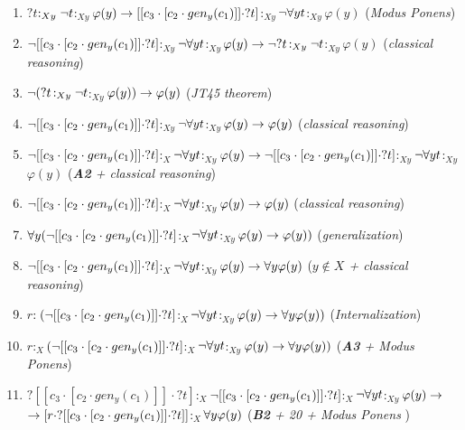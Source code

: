 \begin{enumerate}[1.]
\item $?t$$:_{Xy}\neg t$$:_{Xy}$$\varphi(y) \rightarrow [[c_{3} \cdot [c_{2} \cdot gen_{y}(c_{1})]]\cdot ?t]$$:_{Xy}$$\neg \forall y t$$:_{Xy}$$\varphi(y)$ (\textit{Modus Ponens})


\item $\neg[[c_{3} \cdot [c_{2} \cdot gen_{y}(c_{1})]]\cdot ?t]$$:_{Xy}$$\neg \forall y t$$:_{Xy}$$\varphi(y) \rightarrow \neg  ?t$$:_{Xy}\neg t$$:_{Xy}$$\varphi(y)$ (\textit{classical reasoning})

\item $\neg (?t$$:_{Xy}\neg t$$:_{Xy}$$\varphi(y)) \rightarrow \varphi(y)$ (\textit{JT45 theorem})


\item $\neg[[c_{3} \cdot [c_{2} \cdot gen_{y}(c_{1})]]\cdot ?t]$$:_{Xy}$$\neg \forall y t$$:_{Xy}$$\varphi(y)\rightarrow \varphi(y)$ (\textit{classical reasoning})

\item $\neg[[c_{3} \cdot [c_{2} \cdot gen_{y}(c_{1})]]\cdot ?t]$$:_{X}$$\neg \forall y t$$:_{Xy}$$\varphi(y)\rightarrow  \neg[[c_{3} \cdot [c_{2} \cdot gen_{y}(c_{1})]]\cdot ?t]$$:_{Xy}$$\neg \forall y t$$:_{Xy}$$\varphi(y)$ (\textit{\textbf{A2} + classical reasoning})

\item $\neg[[c_{3} \cdot [c_{2} \cdot gen_{y}(c_{1})]]\cdot ?t]$$:_{X}$$\neg \forall y t$$:_{Xy}$$\varphi(y)\rightarrow \varphi(y)$ (\textit{classical reasoning})

\item $\forall y (\neg[[c_{3} \cdot [c_{2} \cdot gen_{y}(c_{1})]]\cdot ?t]$$:_{X}$$\neg \forall y t$$:_{Xy}$$\varphi(y)\rightarrow \varphi(y))$ (\textit{generalization})


\item $\neg[[c_{3} \cdot [c_{2} \cdot gen_{y}(c_{1})]]\cdot ?t]$$:_{X}$$\neg \forall y t$$:_{Xy}$$\varphi(y)\rightarrow \forall y \varphi(y)$ (\textit{$y \notin X$ + classical reasoning})

\item $r$$:(\neg[[c_{3} \cdot [c_{2} \cdot gen_{y}(c_{1})]]\cdot ?t]$$:_{X}$$\neg \forall y t$$:_{Xy}$$\varphi(y)\rightarrow \forall y \varphi(y))$ (\textit{Internalization})

\item $r$$:_{X}$$(\neg[[c_{3} \cdot [c_{2} \cdot gen_{y}(c_{1})]]\cdot ?t]$$:_{X}$$\neg \forall y t$$:_{Xy}$$\varphi(y)\rightarrow \forall y \varphi(y))$ (\textit{\textbf{A3} + Modus Ponens})



\item $?[[c_{3} \cdot [c_{2} \cdot gen_{y}(c_{1})]]\cdot ?t]$$:_{X}$$\neg[[c_{3} \cdot [c_{2} \cdot gen_{y}(c_{1})]]\cdot ?t]$$:_{X}$$\neg \forall y t$$:_{Xy}$$\varphi(y)\rightarrow$\\
$\rightarrow [r \cdot ?[[c_{3} \cdot [c_{2} \cdot gen_{y}(c_{1})]]\cdot ?t]]$$:_{X}$$\forall y \varphi(y)$
 (\textit{\textbf{B2} + 20 + Modus Ponens })





\end{enumerate}
